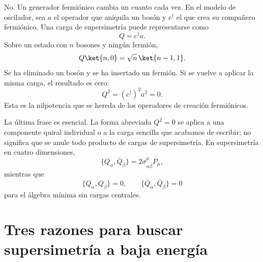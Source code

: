 No. Un generador fermiónico cambia un cuanto cada vez. En el modelo de oscilador, sea \(a\) el operador que aniquila un bosón y \(c^\dagger\) el que crea su compañero fermiónico. Una carga de supersimetría puede representarse como
\begin{equation}
Q=c^\dagger a.
\end{equation}
Sobre un estado con \(n\) bosones y ningún fermión,
\begin{equation}
Q\ket{n,0}
=\sqrt n\,\ket{n-1,1}.
\end{equation}
Se ha eliminado un bosón y se ha insertado un fermión. Si se vuelve a aplicar la misma carga, el resultado es cero:
\begin{equation}
Q^2=(c^\dagger)^2a^2=0.
\end{equation}
Esta es la nilpotencia que se hereda de los operadores de creación fermiónicos.

\begin{classroomqa}
\end{classroomqa}

La última frase es esencial. La forma abreviada \(Q^2=0\) se aplica a una componente quiral individual o a la carga sencilla que acabamos de escribir; no significa que se anule todo producto de cargas de supersimetría. En supersimetría en cuatro dimensiones,
\begin{equation}
\{Q_\alpha,\bar Q_{\dot\beta}\}
=2\sigma^\mu_{\alpha\dot\beta}P_\mu,
\end{equation}
mientras que
\begin{equation}
\{Q_\alpha,Q_\beta\}=0,
\qquad
\{\bar Q_{\dot\alpha},\bar Q_{\dot\beta}\}=0
\end{equation}
para el álgebra mínima sin cargas centrales.

\section{Tres razones para buscar supersimetría a baja energía}

